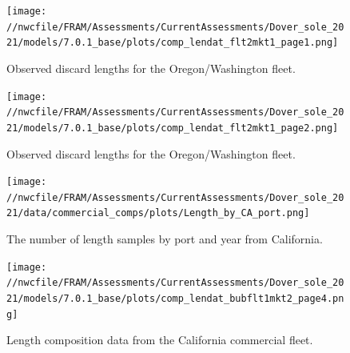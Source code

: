 \documentclass[11pt,
  english,
  a4paper,
]{article}
\begin{document}
\tagmcend\tagstructend


\begin{figure}
\centering
\texttt{[image: //nwcfile/FRAM/Assessments/CurrentAssessments/Dover\_sole\_2021/models/7.0.1\_base/plots/comp\_lendat\_flt2mkt1\_page1.png]}
\caption{Observed discard lengths for the Oregon/Washington fleet.\label{fig:orwa-disc-len-ob-1}}
\end{figure}

\tagmcend\tagstructend


\begin{figure}
\centering
\texttt{[image: //nwcfile/FRAM/Assessments/CurrentAssessments/Dover\_sole\_2021/models/7.0.1\_base/plots/comp\_lendat\_flt2mkt1\_page2.png]}
\caption{Observed discard lengths for the Oregon/Washington fleet.\label{fig:orwa-disc-len-ob-2}}
\end{figure}

\tagmcend\tagstructend


\begin{figure}
\centering
\texttt{[image: //nwcfile/FRAM/Assessments/CurrentAssessments/Dover\_sole\_2021/data/commercial\_comps/plots/Length\_by\_CA\_port.png]}
\caption{The number of length samples by port and year from California.\label{fig:ca-len-port}}
\end{figure}

\tagmcend\tagstructend


\begin{figure}
\centering
\texttt{[image: //nwcfile/FRAM/Assessments/CurrentAssessments/Dover\_sole\_2021/models/7.0.1\_base/plots/comp\_lendat\_bubflt1mkt2\_page4.png]}
\caption{Length composition data from the California commercial fleet.\label{fig:ca-len-data}}
\end{figure}

\tagmcend\tagstructend

\end{document}
